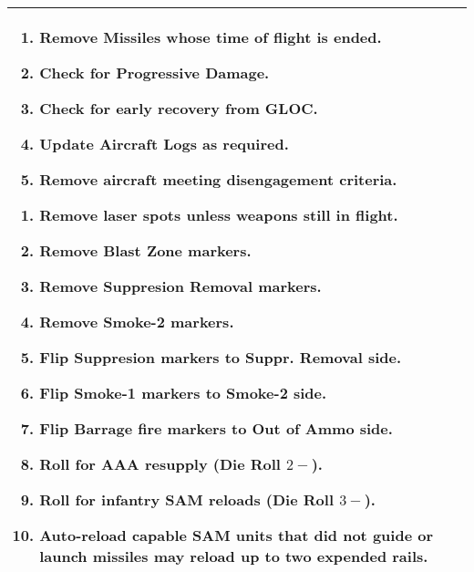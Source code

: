 \begin{twocolumntablefloat}
\begin{twocolumntable}
\begin{tabularx}{1.0\linewidth}{L@{\hspace{\columnsep}}L}
\begin{enumerate}[nosep]
    \item Remove Missiles whose time of flight is ended.
    \item Check for Progressive Damage.
    \item Check for early recovery from GLOC.
    \item Update Aircraft Logs as required.
    \item Remove aircraft meeting disengagement criteria.
\end{enumerate}


\begin{enumerate}[nosep]
    \item Remove laser spots unless weapons still in flight.
    \item Remove Blast Zone markers.
    \item Remove Suppresion Removal markers.
    \item Remove Smoke-2 markers.
    \item Flip Suppresion markers to Suppr. Removal side.
    \item Flip Smoke-1 markers to Smoke-2 side.
    \item Flip Barrage fire markers to Out of Ammo side.
    \item Roll for AAA resupply (Die Roll $2-$).
    \item Roll for infantry SAM reloads (Die Roll $3-$).
    \item Auto-reload capable SAM units that did not guide or launch missiles may reload up to two expended rails.
\end{enumerate}

\\
\bottomrule
\end{tabularx}

\end{twocolumntable}
\end{twocolumntablefloat}

